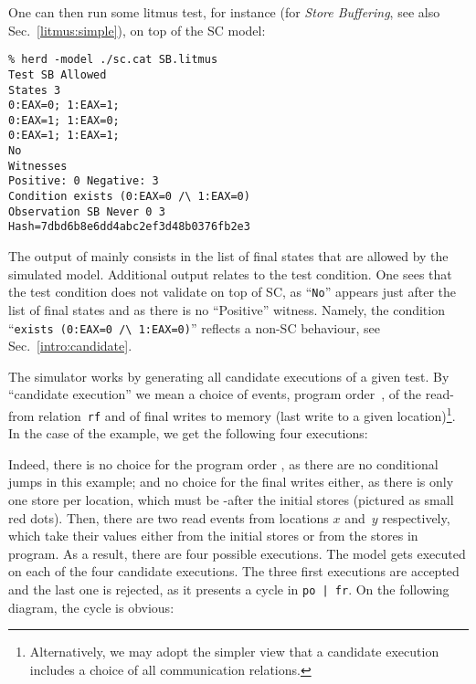 One can then run some litmus test, for instance 
(for \emph{Store Buffering},
see also Sec.~\ref{litmus:simple}), on top of the SC model:
\begin{verbatim}
% herd -model ./sc.cat SB.litmus
Test SB Allowed
States 3
0:EAX=0; 1:EAX=1;
0:EAX=1; 1:EAX=0;
0:EAX=1; 1:EAX=1;
No
Witnesses
Positive: 0 Negative: 3
Condition exists (0:EAX=0 /\ 1:EAX=0)
Observation SB Never 0 3
Hash=7dbd6b8e6dd4abc2ef3d48b0376fb2e3
\end{verbatim}
The output of \herd{} mainly consists in
the list of final states that are allowed by the simulated model.
Additional output relates to the test condition.
One sees that the test condition does not validate on top of SC,
as ``\texttt{No}'' appears just after the list of final states
and as there is no ``Positive'' witness.
Namely, the condition ``\verb+exists (0:EAX=0 /\ 1:EAX=0)+''
reflects a non-SC behaviour, see Sec.~\ref{intro:candidate}.

\label{intro:candidate}%
The simulator \herd{} works by generating all candidate executions
of a given test.
By ``candidate execution'' we mean a choice of events,
program order~, of the read-from relation~\texttt{rf}
and of final writes to memory
(last write to a given location)\footnote{Alternatively,
we may adopt the simpler view that
a candidate execution includes a choice of all communication relations.}.
In the case of the  example, we get the following four executions:
\begin{center}
\quad\quad
{}\quad\quad
{}\quad\quad
{}
\end{center}
Indeed, there is no choice for the program order , as there are no
conditional jumps in this example; and  no choice for the final
writes either, as there is only one store per location, which
must be -after the initial stores (pictured as small red dots).
Then, there are two read events from locations $x$ and~$y$ respectively,
which take their values either from the initial stores or from
the stores in program. As a result, there are four possible executions.
The model  gets executed on each of the four
candidate executions. The three first executions
are accepted and the last one is rejected, as it presents a cycle
in \texttt{po | fr}.
On the following diagram,
the cycle  is obvious:
\begin{center}\end{center}

